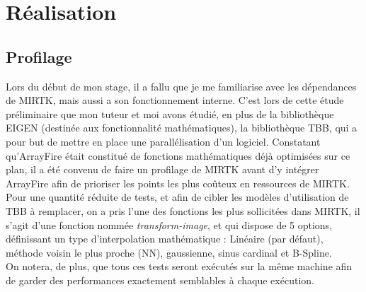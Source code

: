 \documentclass[10pt]{report}
\begin{document}
\chapter{Réalisation}

	\section{Profilage}
	Lors du début de mon stage, il a fallu que je me familiarise avec les dépendances de MIRTK, mais aussi a son fonctionnement interne. C'est lors de cette étude préliminaire que mon tuteur et moi avons étudié, en plus de la bibliothèque EIGEN (destinée aux fonctionnalité mathématiques), la bibliothèque TBB, qui a pour but de mettre en place une parallélisation d'un logiciel. Constatant qu'ArrayFire était constitué de fonctions mathématiques déjà optimisées sur ce plan, il a été convenu de faire un profilage de MIRTK avant d'y intégrer ArrayFire afin de prioriser les points les plus coûteux en ressources de MIRTK. \\
	Pour une quantité réduite de tests, et afin de cibler les modèles d'utilisation de TBB à remplacer, on a pris l'une des fonctions les plus sollicitées dans MIRTK, il s'agit d'une fonction nommée \textit{transform-image}, et qui dispose de 5 options, définissant un type d'interpolation mathématique : Linéaire (par défaut), méthode voisin le plus proche (NN), gaussienne, sinus cardinal et B-Spline. \\
	On notera, de plus, que tous ces tests seront exécutés sur la même machine afin de garder des performances exactement semblables à chaque exécution.
	
\end{document}
